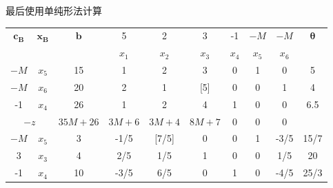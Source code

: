 \documentclass{book}
\begin{document}
最后使用单纯形法计算
\begin{table}[ht]
    \centering
    \begin{tabular}{c|c|c|cccccc|c}
        \hline
        \multirow{2}{*}{$\boldsymbol{c_B}$} & \multirow{2}{*}{$\boldsymbol{x_B}$} & \multirow{2}{*}{$\boldsymbol{b}$} & 5           & 2      & 3     & -1      & $-M$      & $-M$  & \multirow{2}{*}{$\boldsymbol{\theta}$} \\
        \cline{4-9}
                                            &                                     &                                   & $x_1$       & $x_2$  & $x_3$ & $x_4$   & $x_5$     & $x_6$ &                                        \\
        \hline
        $-M$                                & $x_5$                               & 15                                & 1           & 2      & 3     & 0       & 1         & 0     & 5                                      \\
        $-M$                                & $x_6$                               & 20                                & 2           & 1      & [5]   & 0       & 0         & 1     & 4                                      \\
        -1                                  & $x_4$                               & 26                                & 1           & 2      & 4     & 1       & 0         & 0     & 6.5                                    \\
        \hline
        \multicolumn{2}{c|}{$-z$}           & $35M+26$                            & $3M+6$                            & $3M+4$      & $8M+7$ & 0     & 0       & 0         &                                                \\
        \hline
        $-M$                                & $x_5$                               & 3                                 & -1/5        & [7/5]  & 0     & 0       & 1         & -3/5  & 15/7                                   \\
        3                                   & $x_3$                               & 4                                 & 2/5         & 1/5    & 1     & 0       & 0         & 1/5   & 20                                     \\
        -1                                  & $x_4$                               & 10                                & -3/5        & 6/5    & 0     & 1       & 0         & -4/5  & 25/3                                   \\

\end{tabular}
\end{table}
\end{document}
